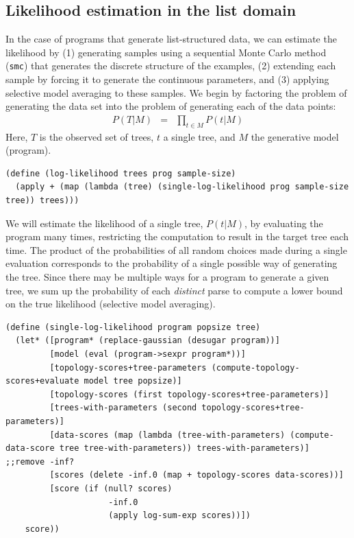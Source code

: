 \documentclass[a4paper,10pt]{article}
\begin{document}
\subsection{Likelihood estimation in the list domain}

In the case of programs that generate list-structured data, we can estimate the likelihood by (1) generating samples using a sequential Monte Carlo method (\texttt{smc}) that generates the discrete structure of the examples, (2) extending each sample by forcing it to generate the continuous parameters, and (3) applying selective model averaging to these samples. We begin by factoring the problem of generating the data set into the problem of generating each of the data points:
\begin{eqnarray}
P(T|M) &=& \prod_{t \in M}P(t|M)
\end{eqnarray}
Here, $T$ is the observed set of trees, $t$ a single tree, and $M$ the generative model (program).
\begin{lstlisting}[frame=trbl]
(define (log-likelihood trees prog sample-size)
  (apply + (map (lambda (tree) (single-log-likelihood prog sample-size tree)) trees)))
\end{lstlisting}
We will estimate the likelihood of a single tree, $P(t|M)$, by evaluating the program many times, restricting the computation to result in the target tree each time. The product of the probabilities of all random choices made during a single evaluation corresponds to the probability of a single possible way of generating the tree. Since there may be multiple ways for a program to generate a given tree, we sum up the probability of each {\em distinct} parse to compute a lower bound on the true likelihood (selective model averaging).
\begin{lstlisting}[frame=trbl]
(define (single-log-likelihood program popsize tree)
  (let* ([program* (replace-gaussian (desugar program))]
         [model (eval (program->sexpr program*))]
         [topology-scores+tree-parameters (compute-topology-scores+evaluate model tree popsize)]
         [topology-scores (first topology-scores+tree-parameters)]
         [trees-with-parameters (second topology-scores+tree-parameters)]
         [data-scores (map (lambda (tree-with-parameters) (compute-data-score tree tree-with-parameters)) trees-with-parameters)] ;;remove -inf?
         [scores (delete -inf.0 (map + topology-scores data-scores))]
         [score (if (null? scores)
                     -inf.0
                     (apply log-sum-exp scores))])
    score))
\end{lstlisting}
\end{document}
